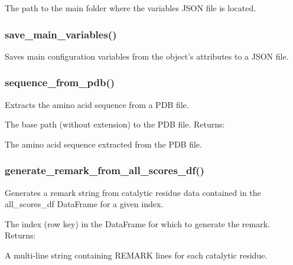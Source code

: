 \documentclass[10pt]{extarticle}
\begin{document}
\par\vspace*{0.5\baselineskip}
{
\begin{description}[noitemsep,topsep=0pt,parsep=0pt,labelwidth=5cm,leftmargin=!,labelindent=0pt,labelsep=0.2cm,itemsep=0pt]
\item[\textcolor{mpgAccentBlue!75!white}{FOLDER\_HOME (str)\dotfill}] The path to the main folder where the variables JSON file is located.
\end{description}
}
\subsubsection{save\_main\_variables()}
Saves main configuration variables from the object's attributes to a JSON file.
\subsubsection{sequence\_from\_pdb()}
Extracts the amino acid sequence from a PDB file.

\par\vspace*{0.5\baselineskip}
{
\begin{description}[noitemsep,topsep=0pt,parsep=0pt,labelwidth=5cm,leftmargin=!,labelindent=0pt,labelsep=0.2cm,itemsep=0pt]
\item[\textcolor{mpgAccentBlue!75!white}{pdb\_in (str)\dotfill}] The base path (without extension) to the PDB file. Returns:
\item[\textcolor{mpgAccentBlue!75!white}{str\dotfill}] The amino acid sequence extracted from the PDB file.
\end{description}
}
\subsubsection{generate\_remark\_from\_all\_scores\_df()}
Generates a remark string from catalytic residue data contained in the all\_scores\_df DataFrame for a given index.

\par\vspace*{0.5\baselineskip}
{
\begin{description}[noitemsep,topsep=0pt,parsep=0pt,labelwidth=5cm,leftmargin=!,labelindent=0pt,labelsep=0.2cm,itemsep=0pt]
\item[\textcolor{mpgAccentBlue!75!white}{index\dotfill}] The index (row key) in the DataFrame for which to generate the remark. Returns:
\item[\textcolor{mpgAccentBlue!75!white}{str\dotfill}] A multi-line string containing REMARK lines for each catalytic residue.
\end{description}
}
\end{document}
